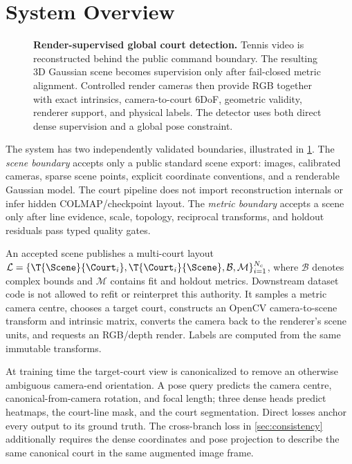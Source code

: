 \section{System Overview}
\label{sec:system}

\begin{figure}[t]
  \centering
  \resizebox{\linewidth}{!}{}
  \caption{\textbf{Render-supervised global court detection.}  Tennis video is
  reconstructed behind the public \NHT{} command boundary.  The resulting 3D
  Gaussian scene becomes supervision only after fail-closed metric alignment.
  Controlled render cameras then provide RGB together with exact intrinsics,
  camera-to-court 6DoF, geometric validity, renderer support, and physical \KP
  labels.  The detector uses
  both direct dense supervision and a global pose constraint.}
  \label{fig:system}
\end{figure}

The system has two independently validated boundaries, illustrated in
\cref{fig:system}.  The \emph{scene boundary} accepts only a public standard
scene export: images, calibrated cameras, sparse scene points, explicit
coordinate conventions, and a renderable Gaussian model.  The court pipeline
does not import reconstruction internals or infer hidden COLMAP/checkpoint
layout.  The \emph{metric boundary} accepts a scene only after line evidence,
scale, topology, reciprocal transforms, and holdout residuals pass typed
quality gates.

An accepted scene publishes a multi-court layout
\(
  \mathcal{L}=\{\T{\Scene}{\Court_i},
  \T{\Court_i}{\Scene},\mathcal{B},\mathcal{M}\}_{i=1}^{N_c}
\),
where \(\mathcal{B}\) denotes complex bounds and \(\mathcal{M}\) contains fit
and holdout metrics.  Downstream dataset code is not allowed to refit or
reinterpret this authority.  It samples a metric camera centre, chooses a
target court, constructs an OpenCV camera-to-scene transform and intrinsic
matrix, converts the camera back to the renderer's scene units, and requests an
RGB/depth render.  Labels are computed from the same immutable transforms.

At training time the target-court view is canonicalized to remove an otherwise
ambiguous camera-end orientation.  A pose query predicts the camera centre,
canonical-from-camera rotation, and focal length; three dense heads predict
\KP heatmaps, the court-line mask, and the court segmentation.  Direct losses
anchor every output to its ground truth.  The cross-branch loss in
\cref{sec:consistency} additionally requires the dense coordinates and pose
projection to describe the same canonical court in the same augmented image
frame.


